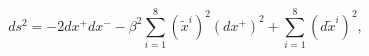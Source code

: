 \begin{equation}
\label{metpp28}
ds^2 = - 2dx^+ dx^- - \beta^2 \sum_{i=1}^8 (\tilde{x}^i)^2 
(dx^+)^2 + \sum_{i=1}^8 (d\tilde{x}^i)^2, 
\end{equation}

